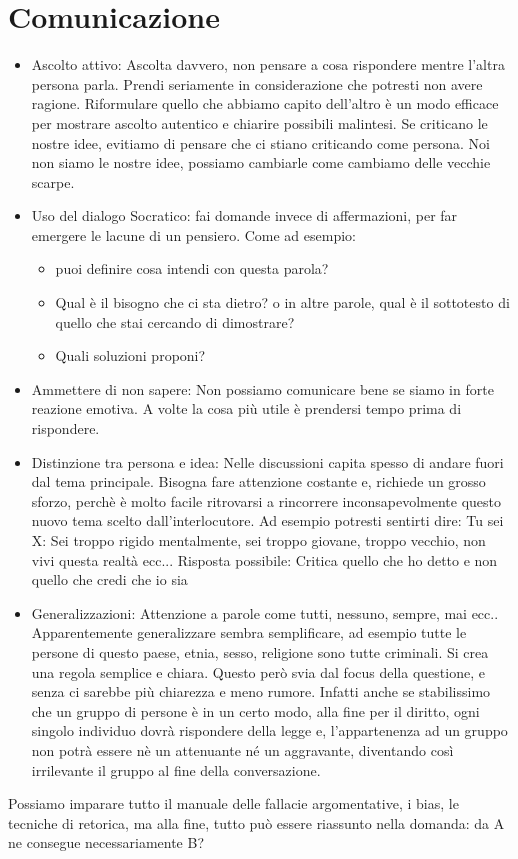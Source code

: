 \documentclass[12pt]{book} %
\begin{document}
\clearpage\section{Comunicazione}

\begin{mdframed}[linewidth=1pt]
\begin{itemize} 
\item Ascolto attivo: Ascolta davvero, non pensare a cosa rispondere mentre l'altra persona parla. Prendi seriamente in considerazione che potresti non avere ragione. 
Riformulare quello che abbiamo capito dell’altro è un modo efficace per mostrare ascolto autentico e chiarire possibili malintesi. Se criticano le nostre idee, evitiamo di pensare che ci stiano criticando come persona. Noi non siamo le nostre idee, possiamo cambiarle come cambiamo delle vecchie scarpe. 
\item Uso del dialogo Socratico: fai domande invece di affermazioni, per far emergere le lacune di un pensiero. Come ad esempio: 
\begin{itemize}
\item puoi definire cosa intendi con questa parola?
\item Qual è il bisogno che ci sta dietro? o in altre parole, qual è il sottotesto di quello che stai cercando di dimostrare? 
\item Quali soluzioni proponi? 
\end{itemize}
\item Ammettere di non sapere: Non possiamo comunicare bene se siamo in forte reazione emotiva. A volte la cosa più utile è prendersi tempo prima di rispondere. 
\item Distinzione tra persona e idea: Nelle discussioni capita spesso di andare fuori dal tema principale. Bisogna fare attenzione costante e, richiede un grosso sforzo, perchè è molto facile ritrovarsi a rincorrere inconsapevolmente questo nuovo tema scelto dall'interlocutore. 
Ad esempio potresti sentirti dire: Tu sei X: Sei troppo rigido mentalmente, sei troppo giovane, troppo vecchio, non vivi questa realtà ecc...
Risposta possibile: Critica quello che ho detto e non quello che credi che io sia
\item Generalizzazioni: Attenzione a parole come tutti, nessuno, sempre, mai ecc.. Apparentemente generalizzare sembra semplificare, ad esempio tutte le persone di questo paese, etnia, sesso, religione sono tutte criminali. Si crea una regola semplice e chiara. Questo però svia dal focus della questione, e senza ci sarebbe più chiarezza e meno rumore. Infatti anche se stabilissimo che un gruppo di persone è in un certo modo, alla fine per il diritto, ogni singolo individuo dovrà rispondere della legge e, l'appartenenza ad un gruppo non potrà essere nè un attenuante né un aggravante, diventando così irrilevante il gruppo al fine della conversazione.
\end{itemize}

Possiamo imparare tutto il manuale delle fallacie argomentative, i bias, le tecniche di retorica, ma alla fine, tutto può essere riassunto nella domanda: da A ne consegue necessariamente B?
\end{mdframed}
\end{document}
